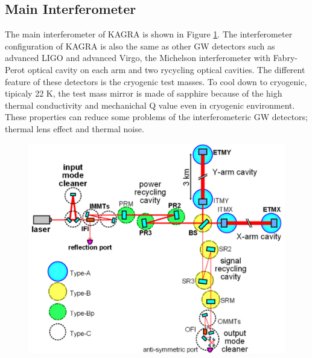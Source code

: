 \subsection{Main Interferometer}
The main interferometer of KAGRA is shown in Figure \ref{img:img601}. The interferometer configuration of KAGRA is also the same as other GW detectors such as advanced LIGO and advanced Virgo, the Michelson interferometer with Fabry-Perot optical cavity on each arm and two rycycling optical cavities. The different feature of these detectors is the cryogenic test masses. To cool down to cryogenic, tipicaly 22 K, the test mass mirror is made of sapphire because of the high thermal conductivity and mechanichal Q value even in cryogenic environment. These properties can reduce some problems of the interferometeric GW detectors; thermal lens effect and thermal noise.
\begin{figure}[p]
  \begin{minipage}{15cm}
    \begin{center}   
      \includegraphics[width=13cm]{./img_chap6/img601.png}
      \label{img:img601} \hfill\vspace{10pt}
    \end{center}
  \end{minipage}
  \begin{minipage}{15cm}
    \begin{center}   

\end{center}
\end{minipage}
\end{figure}
